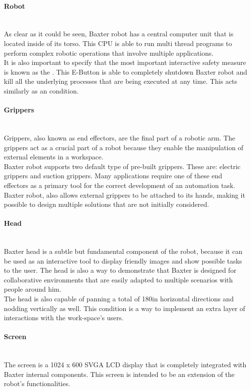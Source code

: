\documentclass[11pt]{report} %
\newcommand{\subsubsubsection}[1]{\paragraph{#1}\mbox{}\\}
\begin{document}
\subsubsubsection{Robot}

As clear as it could be seen, Baxter robot has a central computer unit that is located inside of its torso. This
CPU is able to run multi thread programs to perform complex robotic operations that involve multiple applications.\\

It is also important to specify that the most important interactive safety measure is known as the . This E-Button is able to completely shutdown Baxter robot and kill all the underlying processes that are being executed at any time. This acts similarly as an  condition.\\


\subsubsubsection{Grippers}

Grippers, also known as end effectors, are the final part of a robotic arm. The grippers act as a crucial part of a robot because they enable the manipulation of external elements in a workspace.\\

Baxter robot supports two default type of pre-built grippers. These are: electric grippers and suction grippers. Many applications require one of these end effectors as a primary tool for the correct development of an automation task.\\

Baxter robot, also allows external  grippers to be attached to its hands, making it possible to design multiple solutions that are not initially considered.\\

\subsubsubsection{Head}

Baxter head is a subtle but fundamental component of the robot, because it can be used as an interactive tool to display friendly images and show possible tasks to the user. The head is also a way to demonstrate that Baxter is designed for collaborative environments that are easily adapted to multiple scenarios with people around him.\\ 

The head is also capable of panning a total of 180\textdegree \space in horizontal directions and nodding vertically as well. This condition is a way to implement an extra layer of interactions with the work-space's users.\\

\subsubsubsection{Screen}

The screen is a 1024 x 600 SVGA LCD display that is completely integrated with Baxter internal components. This screen is intended to be an extension of the robot's functionalities.\\
\end{document}
